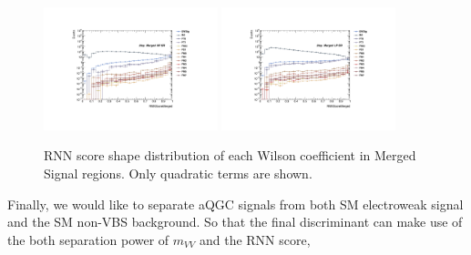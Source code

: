 \begin{figure}[]
    \centering
   \includegraphics[width=0.45\textwidth]{figures/aQGC/RNNScoreMerged_SR_HP_aQGC.pdf}
   \includegraphics[width=0.45\textwidth]{figures/aQGC/RNNScoreMerged_SR_LP_aQGC.pdf}
    \caption{RNN score shape distribution of each Wilson coefficient in Merged Signal regions. Only quadratic terms are shown.}
    \label{fig:2lepaQGCshapeRNNh}
\end{figure}
Finally, we would like to separate aQGC signals from both SM electroweak signal and the SM non-VBS background.
So that the final discriminant can make use of the both separation power of $m_{VV}$ and the RNN score, 

